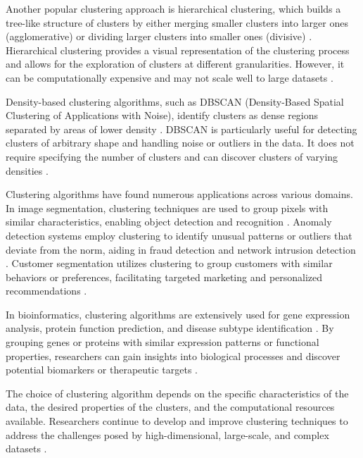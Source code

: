 Another popular clustering approach is hierarchical clustering, which builds a tree-like structure of clusters by either merging smaller clusters into larger ones (agglomerative) or dividing larger clusters into smaller ones (divisive) \citep{johnson1967hierarchical}. Hierarchical clustering provides a visual representation of the clustering process and allows for the exploration of clusters at different granularities. However, it can be computationally expensive and may not scale well to large datasets \citep{mullner2011modern}.

Density-based clustering algorithms, such as DBSCAN (Density-Based Spatial Clustering of Applications with Noise), identify clusters as dense regions separated by areas of lower density \citep{ester1996density}. DBSCAN is particularly useful for detecting clusters of arbitrary shape and handling noise or outliers in the data. It does not require specifying the number of clusters and can discover clusters of varying densities \citep{schubert2017dbscan}.

Clustering algorithms have found numerous applications across various domains. In image segmentation, clustering techniques are used to group pixels with similar characteristics, enabling object detection and recognition \citep{shi2000normalized}. Anomaly detection systems employ clustering to identify unusual patterns or outliers that deviate from the norm, aiding in fraud detection and network intrusion detection \citep{chandola2009anomaly}. Customer segmentation utilizes clustering to group customers with similar behaviors or preferences, facilitating targeted marketing and personalized recommendations \citep{ngai2009application}.

In bioinformatics, clustering algorithms are extensively used for gene expression analysis, protein function prediction, and disease subtype identification \citep{eisen1998cluster}. By grouping genes or proteins with similar expression patterns or functional properties, researchers can gain insights into biological processes and discover potential biomarkers or therapeutic targets \citep{jiang2004cluster}.

The choice of clustering algorithm depends on the specific characteristics of the data, the desired properties of the clusters, and the computational resources available. Researchers continue to develop and improve clustering techniques to address the challenges posed by high-dimensional, large-scale, and complex datasets \citep{rodriguez2019clustering}.

